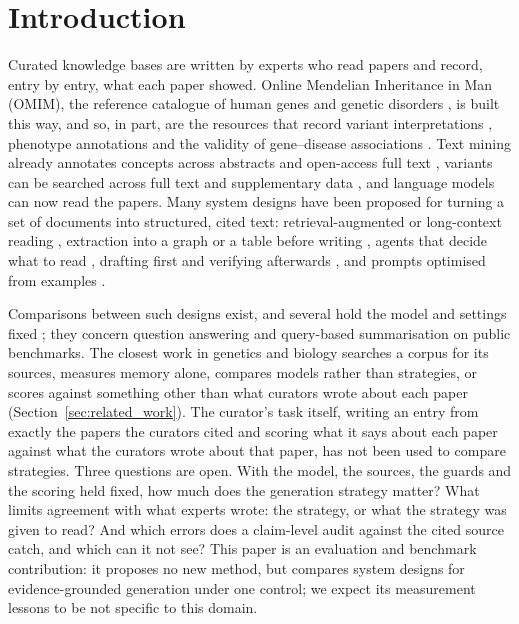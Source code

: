 \documentclass{article} %
\begin{document}
\section{Introduction}
\label{sec:intro}
Curated knowledge bases are written by experts who read papers and record, entry by entry, what each paper showed. Online Mendelian Inheritance in Man (OMIM), the reference catalogue of human genes and genetic disorders \citep{Amberger2014OmimorgOnline,amberger2019omim,hamosh2021online}, is built this way, and so, in part, are the resources that record variant interpretations \citep{Landrum2017ClinvarImproving,landrum2025clinvar}, phenotype annotations \citep{robinson2008human,gargano2024human} and the validity of gene--disease associations \citep{strande2017evaluating}. Text mining already annotates concepts across abstracts and open-access full text \citep{Wei2019PubtatorCentral,wei2024pubtator}, variants can be searched across full text and supplementary data \citep{allot2023tracking}, and language models can now read the papers. Many system designs have been proposed for turning a set of documents into structured, cited text: retrieval-augmented or long-context reading \citep{Lewis2020RetrievalaugmentedGeneration,li2024retrieval}, extraction into a graph or a table before writing \citep{edge2024local,joshi2026sliders}, agents that decide what to read \citep{Nakano2021WebgptBrowserassisted,Lla2023PaperqaRetrievalaugmented,skarlinski2024language}, drafting first and verifying afterwards \citep{Gao2022RarrResearching,dhuliawala2024chainofverification}, and prompts optimised from examples \citep{Khattab2023DspyCompiling,agrawal2026gepa}.

Comparisons between such designs exist, and several hold the model and settings fixed \citep{li2024retrieval,Li2025LaraBenchmarking,han2025rag}; they concern question answering and query-based summarisation on public benchmarks. The closest work in genetics and biology searches a corpus for its sources, measures memory alone, compares models rather than strategies, or scores against something other than what curators wrote about each paper (Section~\ref{sec:related_work}). The curator's task itself, writing an entry from exactly the papers the curators cited and scoring what it says about each paper against what the curators wrote about that paper, has not been used to compare strategies. Three questions are open. With the model, the sources, the guards and the scoring held fixed, how much does the generation strategy matter? What limits agreement with what experts wrote: the strategy, or what the strategy was given to read? And which errors does a claim-level audit against the cited source catch, and which can it not see? This paper is an evaluation and benchmark contribution: it proposes no new method, but compares system designs for evidence-grounded generation under one control; we expect its measurement lessons to be not specific to this domain.
\end{document}
